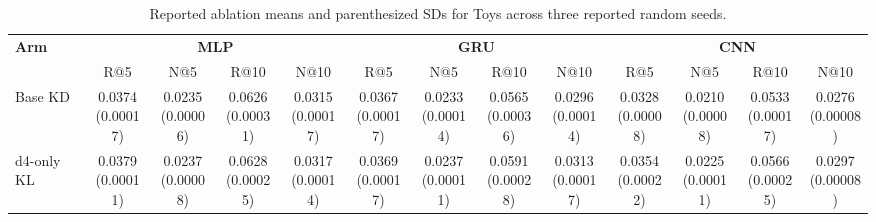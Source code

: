 \begin{table}[t]
\centering
\caption{Reported ablation means and parenthesized SDs for Toys across three reported random seeds.}
\fontsize{6.6}{7.8}\selectfont
\setlength{\tabcolsep}{1.0pt}
\renewcommand{\arraystretch}{1.10}
\begin{tabular*}{\textwidth}{@{\extracolsep{\fill}} l *{12}{c} @{}}
\toprule
\textbf{Arm} & \multicolumn{4}{c}{\textbf{MLP}} & \multicolumn{4}{c}{\textbf{GRU}} & \multicolumn{4}{c}{\textbf{CNN}} \\
\cmidrule(lr){2-5}\cmidrule(lr){6-9}\cmidrule(l){10-13}
 & R@5 & N@5 & R@10 & N@10 & R@5 & N@5 & R@10 & N@10 & R@5 & N@5 & R@10 & N@10 \\
\midrule
Base KD & \shortstack[c]{0.0374\\[-1pt]{\tiny(0.00017)}} & \shortstack[c]{0.0235\\[-1pt]{\tiny(0.00006)}} & \shortstack[c]{0.0626\\[-1pt]{\tiny(0.00031)}} & \shortstack[c]{0.0315\\[-1pt]{\tiny(0.00017)}} & \shortstack[c]{0.0367\\[-1pt]{\tiny(0.00017)}} & \shortstack[c]{0.0233\\[-1pt]{\tiny(0.00014)}} & \shortstack[c]{0.0565\\[-1pt]{\tiny(0.00036)}} & \shortstack[c]{0.0296\\[-1pt]{\tiny(0.00014)}} & \shortstack[c]{0.0328\\[-1pt]{\tiny(0.00008)}} & \shortstack[c]{0.0210\\[-1pt]{\tiny(0.00008)}} & \shortstack[c]{0.0533\\[-1pt]{\tiny(0.00017)}} & \shortstack[c]{0.0276\\[-1pt]{\tiny(0.00008)}} \\
\addlinespace[1pt]
d4-only KL & \shortstack[c]{0.0379\\[-1pt]{\tiny(0.00011)}} & \shortstack[c]{0.0237\\[-1pt]{\tiny(0.00008)}} & \shortstack[c]{0.0628\\[-1pt]{\tiny(0.00025)}} & \shortstack[c]{0.0317\\[-1pt]{\tiny(0.00014)}} & \shortstack[c]{0.0369\\[-1pt]{\tiny(0.00017)}} & \shortstack[c]{0.0237\\[-1pt]{\tiny(0.00011)}} & \shortstack[c]{0.0591\\[-1pt]{\tiny(0.00028)}} & \shortstack[c]{0.0313\\[-1pt]{\tiny(0.00017)}} & \shortstack[c]{0.0354\\[-1pt]{\tiny(0.00022)}} & \shortstack[c]{0.0225\\[-1pt]{\tiny(0.00011)}} & \shortstack[c]{0.0566\\[-1pt]{\tiny(0.00025)}} & \shortstack[c]{0.0297\\[-1pt]{\tiny(0.00008)}} \\

\end{tabular*}
\end{table}
